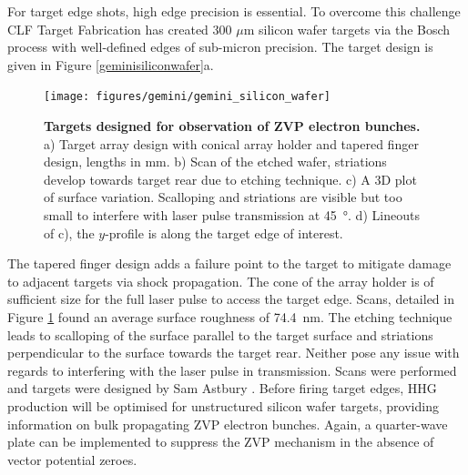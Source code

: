 For target edge shots, high edge precision is essential. To overcome this challenge CLF Target Fabrication has created 300 $\mu$m silicon wafer targets via the Bosch process with well-defined edges of sub-micron precision. The target design is given in Figure \ref{geminisiliconwafer}a.
\begin{figure}
	\centering
	\texttt{[image: figures/gemini/gemini\_silicon\_wafer]}
	\caption[Attosecond ZVP electron bunch targets]{\textbf{Targets designed for observation of ZVP electron bunches.} a) Target array design with conical array holder and tapered finger design, lengths in mm. b) Scan of the etched wafer, striations develop towards target rear due to etching technique. c) A 3D plot of surface variation. Scalloping and striations are visible but too small to interfere with laser pulse transmission at \qty{45}{\degree}. d) Lineouts of c), the $y$-profile is along the target edge of interest.}
	\label{fig:geminisiliconwafer}
\end{figure}
The tapered finger design adds a failure point to the target to mitigate damage to adjacent targets via shock propagation. The cone of the array holder is of sufficient size for the full laser pulse to access the target edge. Scans, detailed in Figure \ref{fig:geminisiliconwafer} found an average surface roughness of \qty{74.4}{nm}. The etching technique leads to scalloping of the surface parallel to the target surface and striations perpendicular to the surface towards the target rear. Neither pose any issue with regards to interfering with the laser pulse in transmission. Scans were performed and targets were designed by Sam Astbury \cite{astburyTargetFabricationGroup2024}. Before firing target edges, HHG production will be optimised for unstructured silicon wafer targets, providing information on bulk propagating ZVP electron bunches. Again, a quarter-wave plate can be implemented to suppress the ZVP mechanism in the absence of vector potential zeroes.

